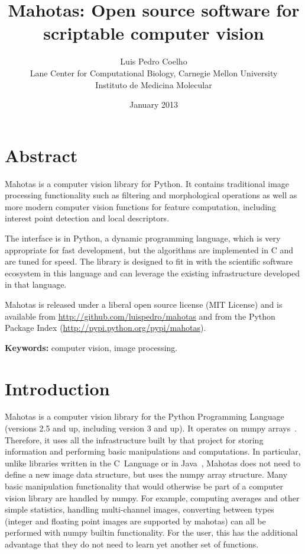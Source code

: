 \documentclass{scrartcl}
\title{Mahotas: Open source software for scriptable computer vision}
\author{Luis Pedro Coelho\\
Lane Center for Computational Biology, Carnegie Mellon University\\
Instituto de Medicina Molecular}
\date{January 2013}
\newcommand*{\cpp}{{C\nolinebreak[4]\hspace{-.05em}\raisebox{.4ex}{\tiny\textbf{++}}}}
\begin{document}
\maketitle

\section*{Abstract}
Mahotas is a computer vision library for Python. It contains traditional image
processing functionality such as filtering and morphological operations as well
as more modern computer vision functions for feature computation, including
interest point detection and local descriptors.

The interface is in Python, a dynamic programming language, which is very
appropriate for fast development, but the algorithms are implemented in \cpp{}
and are tuned for speed. The library is designed to fit in with the scientific
software ecosystem in this language and can leverage the existing
infrastructure developed in that language.

Mahotas is released under a liberal open source license (MIT License) and is
available from \url{http://github.com/luispedro/mahotas} and from the Python Package
Index (\url{http://pypi.python.org/pypi/mahotas}).

\textbf{Keywords:} computer vision, image processing.

\section{Introduction}

Mahotas is a computer vision library for the Python Programming Language
(versions 2.5 and up, including version 3 and up). It operates on numpy
arrays~\citep{numpystructure}. Therefore, it uses all the infrastructure built
by that project for storing information and performing basic manipulations and
computations. In particular, unlike libraries written in the C~Language or in
Java~\citep{Pietzsch15112012,Marcel:2010:TMP:1873951.1874254}, Mahotas does not need to define a
new image data structure, but uses the numpy array structure. Many basic
manipulation functionality that would otherwise be part of a computer vision
library are handled by numpy. For example, computing averages and other simple
statistics, handling multi-channel images, converting between types (integer
and floating point images are supported by mahotas) can all be performed with
numpy builtin functionality. For the user, this has the additional advantage
that they do not need to learn yet another set of functions.
\end{document}
